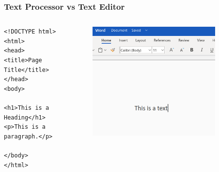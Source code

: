 \documentclass[aspectratio=169]{beamer}
\begin{document}
\begin{frame}[fragile]
\frametitle{Text Processor vs Text Editor}

\begin{columns}[c]

    \begin{column}{.5\textwidth}
    \small
\begin{verbatim}
<!DOCTYPE html>
<html>
<head>
<title>Page Title</title>
</head>
<body>

<h1>This is a Heading</h1>
<p>This is a paragraph.</p>

</body>
</html> 
\end{verbatim}
    \normalsize
    \end{column}

    \begin{column}{.5\textwidth}
    \begin{figure}
        \centering
        \includegraphics[width=0.9\textwidth]{images/ms_word_picture.png}
    \end{figure}
    \end{column}

\end{columns}
\end{frame}
\end{document}
